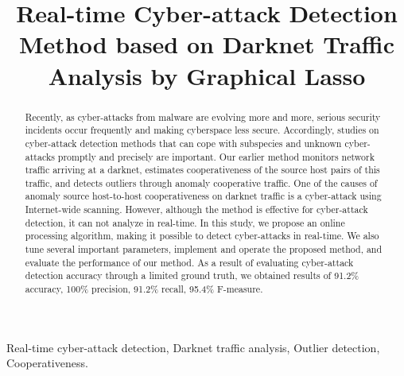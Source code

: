 \documentclass[conference]{IEEEtran}
\begin{document}
\title{
  Real-time Cyber-attack Detection Method based on Darknet Traffic Analysis by Graphical Lasso
}

\author{
}


\maketitle

\begin{abstract}
Recently, as cyber-attacks from malware are evolving more and more, serious security incidents occur frequently and making cyberspace less secure.
Accordingly, studies on cyber-attack detection methods that can cope with subspecies and unknown cyber-attacks promptly and precisely are important.
Our earlier method monitors network traffic arriving at a darknet, estimates cooperativeness of the source host pairs of this traffic, and detects outliers through anomaly cooperative traffic.
One of the causes of anomaly source host-to-host cooperativeness on darknet traffic is a cyber-attack using Internet-wide scanning.
However, although the method is effective for cyber-attack detection, it can not analyze in real-time.
In this study, we propose an online processing algorithm, making it possible to detect cyber-attacks in real-time.
We also tune several important parameters, implement and operate the proposed method, and evaluate the performance of our method.
As a result of evaluating cyber-attack detection accuracy through a limited ground truth, we obtained results of 91.2\% accuracy, 100\% precision, 91.2\% recall, 95.4\% F-measure.
\end{abstract}

\begin{IEEEkeywords}
Real-time cyber-attack detection, Darknet traffic analysis, Outlier detection, Cooperativeness.
\end{IEEEkeywords}
\end{document}
